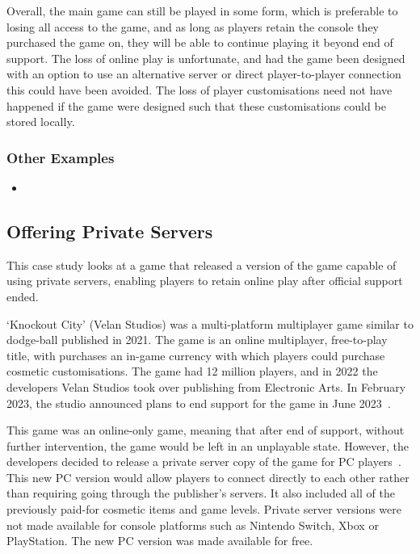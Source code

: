 Overall, the main game can still be played in some form, which is preferable to losing all access to the game,
and as long as players retain the console they purchased the game on, they will be able to continue playing it beyond end of support.
The loss of online play is unfortunate, and had the game been designed with an option to use an alternative server or direct player-to-player connection this could have been avoided.
The loss of player customisations need not have happened if the game were designed such that these customisations could be stored locally.

\subsubsection*{Other Examples}
\begin{itemize}
    \item
\end{itemize}

\subsection{Offering Private Servers}
This case study looks at a game that released a version of the game capable of using private servers,
enabling players to retain online play after official support ended.

`Knockout City' (Velan Studios) was a multi-platform multiplayer game similar to dodge-ball published in 2021.
The game is an online multiplayer, free-to-play title, with purchases an in-game currency with which players could purchase cosmetic customisations.
The game had 12 million players\cite{knockout-stats}, and in 2022 the developers Velan Studios took over publishing from Electronic Arts.
In February 2023, the studio announced plans to end support for the game in June 2023~\cite{knockout-eos-2023}.

This game was an online-only game, meaning that after end of support, without further intervention, the game would be left in an unplayable state.
However, the developers decided to release a private server copy of the game for PC players~\cite{knockout-private}.
This new PC version would allow players to connect directly to each other rather than requiring going through the publisher's servers.
It also included all of the previously paid-for cosmetic items and game levels.
Private server versions were not made available for console platforms such as Nintendo Switch, Xbox or PlayStation.
The new PC version was made available for free.

